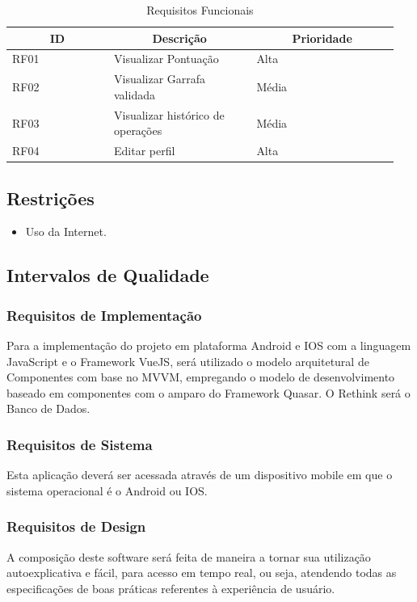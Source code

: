 \begin{apendicesenv}
\begin{table}[htp]
    \centering
    \caption{Requisitos Funcionais}
    \label{my-label}
    \begin{tabular}{|p{0.25\linewidth}|p{0.35\linewidth}|p{0.35\linewidth}|}
        \hline
        \multicolumn{1}{|c|}{\textbf{ID}} & \multicolumn{1}{c|}{\textbf{Descrição}} & \multicolumn{1}{c|}{\textbf{Prioridade}} \\ \hline
        RF01 & Visualizar Pontuação & Alta \\ \hline
        RF02 & Visualizar Garrafa validada & Média \\ \hline
        RF03 & Visualizar histórico de operações & Média \\ \hline
        RF04 & Editar perfil & Alta \\ \hline
    \end{tabular}
\end{table}

\subsection{Restrições}

\begin{itemize}
    \item Uso da Internet.
\end{itemize}

\subsection{Intervalos de Qualidade}

\subsubsection{Requisitos de Implementação}
Para a implementação do projeto em plataforma Android e IOS com a linguagem JavaScript e o Framework VueJS, será utilizado o modelo arquitetural de Componentes com base no MVVM, empregando o modelo de desenvolvimento baseado em componentes com o amparo do Framework Quasar. O Rethink será o Banco de Dados.

\subsubsection{Requisitos de Sistema}
Esta aplicação deverá ser acessada através de um dispositivo mobile em que o sistema operacional é o Android ou IOS.

\subsubsection{Requisitos de Design}
A composição deste software será feita de maneira a tornar sua utilização autoexplicativa e fácil, para acesso em tempo real, ou seja, atendendo todas as especificações de boas práticas referentes à experiência de usuário.


\end{apendicesenv}
